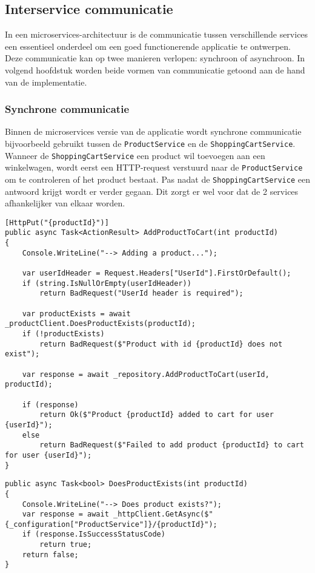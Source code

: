 \subsection{Interservice communicatie}

In een microservices-architectuur is de communicatie tussen verschillende services een essentieel onderdeel om een goed functionerende applicatie te ontwerpen. Deze communicatie kan op twee manieren verlopen: synchroon of asynchroon. In volgend hoofdstuk worden beide vormen van communicatie getoond aan de hand van de implementatie.

\subsubsection{Synchrone communicatie}

Binnen de microservices versie van de applicatie wordt synchrone communicatie bijvoorbeeld gebruikt tussen de \texttt{ProductService} en de \texttt{ShoppingCartService}. Wanneer de \texttt{ShoppingCartService} een product wil toevoegen aan een winkelwagen, wordt eerst een HTTP-request verstuurd naar de \texttt{ProductService} om te controleren of het product bestaat. Pas nadat de \texttt{ShoppingCartService} een antwoord krijgt wordt er verder gegaan. Dit zorgt er wel voor dat de 2 services afhankelijker van elkaar worden.
\medskip

\begin{lstlisting}[style=mystyleA, caption=ShoppingCartsController.cs (fragment)(Microservice), label=lst:MicroSCCPUT]
[HttpPut("{productId}")]
public async Task<ActionResult> AddProductToCart(int productId)
{
	Console.WriteLine("--> Adding a product...");
	
	var userIdHeader = Request.Headers["UserId"].FirstOrDefault();
	if (string.IsNullOrEmpty(userIdHeader))
		return BadRequest("UserId header is required");
	
	var productExists = await _productClient.DoesProductExists(productId);
	if (!productExists)
		return BadRequest($"Product with id {productId} does not exist");
	
	var response = await _repository.AddProductToCart(userId, productId);
	
	if (response)
		return Ok($"Product {productId} added to cart for user {userId}");
	else
		return BadRequest($"Failed to add product {productId} to cart for user {userId}");
}
\end{lstlisting}

\begin{lstlisting}[style=mystyleA, caption=ProductDataClient.cs (fragment)(Microservice), label=lst:MicroProductDataCl]
public async Task<bool> DoesProductExists(int productId)
{
	Console.WriteLine("--> Does product exists?");
	var response = await _httpClient.GetAsync($"{_configuration["ProductService"]}/{productId}");
	if (response.IsSuccessStatusCode)
		return true;
	return false;
}
\end{lstlisting}

